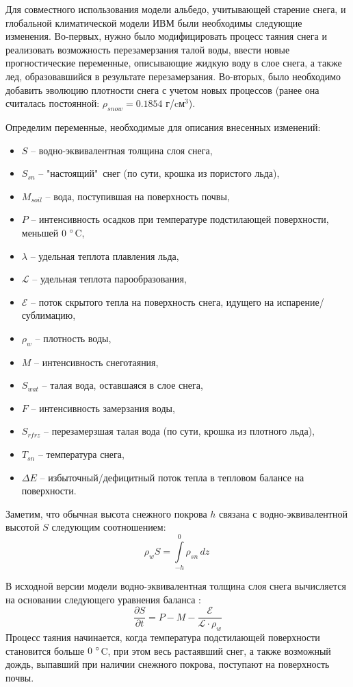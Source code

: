 \documentclass[a4paper, fontsize=14pt]{scrartcl}
\begin{document}
Для совместного использования модели альбедо, учитывающей старение снега, и глобальной климатической модели ИВМ были необходимы следующие изменения. Во-первых, нужно было модифицировать процесс таяния снега и реализовать возможность перезамерзания талой воды, ввести новые прогностические переменные, описывающие жидкую воду в слое снега, а также лед, образовавшийся в результате перезамерзания. Во-вторых, было необходимо добавить эволюцию плотности снега с учетом новых процессов (ранее она считалась постоянной: $\rho_{snow} = 0.1854 $ г/cм$^3$).

Определим переменные, необходимые для описания внесенных изменений: 
\begin{itemize}
    \item $S$ -- водно-эквивалентная толщина слоя снега,
    \item $S_{sn}$ -- "настоящий"\  снег (по сути, крошка из пористого льда), 
    \item $M_{soil}$ -- вода, поступившая на поверхность почвы,
    \item $P$ -- интенсивность осадков при температуре подстилающей поверхности, меньшей $0 ~\degree$C,
    \item $\lambda$ -- удельная теплота плавления льда, 
    \item $\mathcal{L}$ -- удельная теплота парообразования, 
    \item $\mathcal{E}$ -- поток скрытого тепла на поверхность снега, идущего на испарение/сублимацию,
    \item $\rho_w$ -- плотность воды,
    \item $M$ -- интенсивность снеготаяния,
    \item $S_{wat}$ -- талая вода, оставшаяся в слое снега,
    \item $F$ -- интенсивность замерзания воды,
    \item $S_{rfrz}$ -- перезамерзшая талая вода (по сути, крошка из плотного льда),
    \item $T_{sn}$ -- температура снега, 
    \item $\Delta E$ -- избыточный/дефицитный поток тепла в тепловом балансе на поверхности.
\end{itemize}
Заметим, что обычная высота снежного покрова $h$ связана с водно-эквивалентной высотой $S$ следующим соотношением:
\begin{equation}
    \rho_w S =  \int\limits_{-h}^0 \rho_{sn} \, dz\  \label{sys}
\end{equation}

В исходной версии модели водно-эквивалентная толщина слоя снега вычисляется на основании следующего уравнения баланса \cite{Volodin1998, Volodina2000}:
\begin{equation}
    \dfrac{\partial S}{\partial t} = P - M - \dfrac{\mathcal{E}}{\mathcal{L} \cdot \rho_w}  \label{sys}
\end{equation}
Процесс таяния начинается, когда температура подстилающей поверхности становится больше $0 ~\degree$C, при этом весь растаявший снег, а также возможный дождь, выпавший при наличии снежного покрова, поступают на поверхность почвы.
\end{document}
